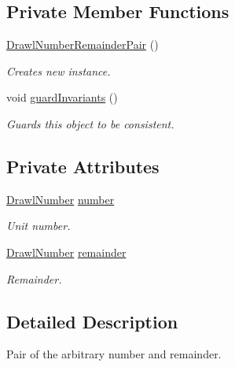 \subsection*{Private Member Functions}
\begin{DoxyCompactItemize}
\item 
\hyperlink{classcom_1_1aarrelaakso_1_1drawl_1_1_drawl_number_remainder_pair_aac59fe33b4a1888d48ba7bf4bc0ebaa4}{Drawl\+Number\+Remainder\+Pair} ()
\begin{DoxyCompactList}\small\item\em Creates new instance. \end{DoxyCompactList}\item 
void \hyperlink{classcom_1_1aarrelaakso_1_1drawl_1_1_drawl_number_remainder_pair_ae5c688bbfb072f385c338ab16f34c7a8}{guard\+Invariants} ()
\begin{DoxyCompactList}\small\item\em Guards this object to be consistent. \end{DoxyCompactList}\end{DoxyCompactItemize}
\subsection*{Private Attributes}
\begin{DoxyCompactItemize}
\item 
\hyperlink{classcom_1_1aarrelaakso_1_1drawl_1_1_drawl_number}{Drawl\+Number} \hyperlink{classcom_1_1aarrelaakso_1_1drawl_1_1_drawl_number_remainder_pair_a8c62602c155e6b1fe737605fe7229b36}{number}
\begin{DoxyCompactList}\small\item\em Unit number. \end{DoxyCompactList}\item 
\hyperlink{classcom_1_1aarrelaakso_1_1drawl_1_1_drawl_number}{Drawl\+Number} \hyperlink{classcom_1_1aarrelaakso_1_1drawl_1_1_drawl_number_remainder_pair_a95c7e55169d65822bbceb08ff2f800dc}{remainder}
\begin{DoxyCompactList}\small\item\em Remainder. \end{DoxyCompactList}\end{DoxyCompactItemize}


\subsection{Detailed Description}
Pair of the arbitrary number and remainder. 

